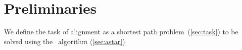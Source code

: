 \section{Preliminaries} \label{sec:prereq}

We define the task of alignment as a shortest path problem~(\cref{sec:task}) to
be solved using the \A~algorithm (\cref{sec:astar}).
%


